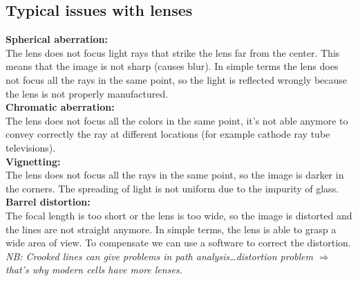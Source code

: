 \subsection{Typical issues with lenses}
\textbf{Spherical aberration:} 
\\The lens does not focus light rays that strike the lens far from the center. This means that the image is not sharp (causes blur).
In simple terms the lens does not focus all the rays in the same point, so the light is reflected wrongly because the lens is not properly manufactured.
\\\textbf{Chromatic aberration:}
\\The lens does not focus all the colors in the same point, it's not able anymore to convey correctly the ray at different locations (for example cathode ray tube televisions).
\\\textbf{Vignetting:}
\\The lens does not focus all the rays in the same point, so the image is darker in the corners. The spreading of light is not uniform due to the impurity of glass.
\\\textbf{Barrel distortion:}
\\The focal length is too short or the lens is too wide, so the image is distorted and the lines are not straight anymore.
In simple terms, the lens is able to grasp a wide area of view. To compensate we can use a software to correct the distortion. 
\\\textit{NB: Crooked lines can give problems in path analysis\dots distortion problem $\Rightarrow$ that's why modern cells have more lenses.}
